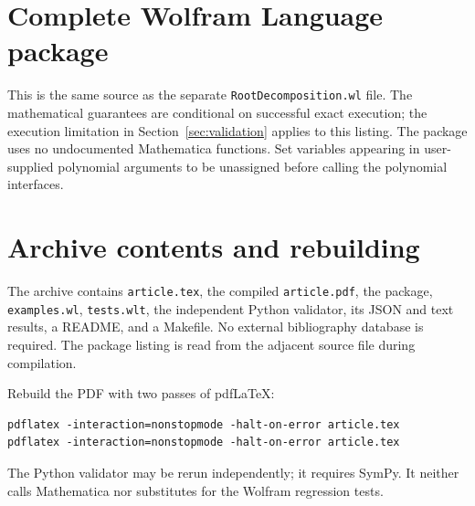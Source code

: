 \documentclass[11pt,a4paper]{article}
\theoremstyle{definition}\newtheorem{definition}[theorem]{Definition}
\theoremstyle{remark}\newtheorem{remark}[theorem]{Remark}
\newcommand{\code}[1]{\texttt{#1}}
\begin{document}
\appendix
\newpage
\section{Complete Wolfram Language package}
\label{app:source}
This is the same source as the separate \code{RootDecomposition.wl} file. The mathematical guarantees are conditional on successful exact execution; the execution limitation in Section~\ref{sec:validation} applies to this listing. The package uses no undocumented Mathematica functions. Set variables appearing in user-supplied polynomial arguments to be unassigned before calling the polynomial interfaces.


\section{Archive contents and rebuilding}
The archive contains \code{article.tex}, the compiled \code{article.pdf}, the package, \code{examples.wl}, \code{tests.wlt}, the independent Python validator, its JSON and text results, a README, and a Makefile. No external bibliography database is required. The package listing is read from the adjacent source file during compilation.

Rebuild the PDF with two passes of pdfLaTeX:
\begin{lstlisting}[language={}]
pdflatex -interaction=nonstopmode -halt-on-error article.tex
pdflatex -interaction=nonstopmode -halt-on-error article.tex
\end{lstlisting}
The Python validator may be rerun independently; it requires SymPy. It neither calls Mathematica nor substitutes for the Wolfram regression tests.
\end{document}
